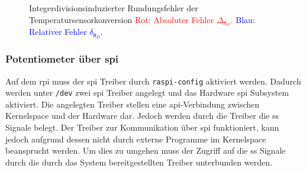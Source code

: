 \begin{figure}
    \centering
    \caption[Integerdivisionsinduzierter Rundungsfehler]{Integerdivisionsinduzierter Rundungsfehler der Temperatursensorkonversion
    \textcolor{red}{Rot: Absoluter Fehler $\Delta_{\texttt{M}_D}$.}
    \textcolor{blue}{Blau: Relativer Fehler $\delta_{\texttt{M}_D}$.}
    }
    \label{fig:rounding-err}
\end{figure}



\subsubsection{Potentiometer über \acrshort{spi}}




Auf dem \gls{rpi} muss der \gls{spi} Treiber durch \texttt{raspi-config} aktiviert werden.
Dadurch werden unter \texttt{/dev} zwei \gls{spi} Treiber angelegt und das Hardware \gls{spi} Subsystem aktiviert.
Die angelegten Treiber stellen eine \gls{api}-Verbindung zwischen Kernelspace und der Hardware dar.
Jedoch werden durch die Treiber die \gls{ss} Signale belegt.
Der Treiber zur Kommunikation über \gls{spi} funktioniert, kann jedoch aufgrund dessen nicht durch externe Programme im Kernelspace beansprucht werden.
Um dies zu umgehen muss der Zugriff auf die \gls{ss} Signale durch die durch das System bereitgestellten Treiber unterbunden werden.

